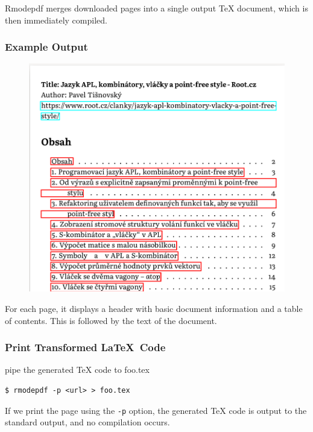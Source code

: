 Rmodepdf merges downloaded pages into a single output TeX document, which is then immediately compiled.


\begin{frame}[fragile]
  \frametitle{Example Output}
  \begin{figure}
    \begin{center}
      \includegraphics[height=0.7\textheight]{img/rmodepdf-article.png}
    \end{center}
  \end{figure}
  
\end{frame}

For each page, it displays a header with basic document information and a table
of contents. This is followed by the text of the document.



\begin{frame}[fragile]
  \frametitle{Print Transformed \LaTeX\ Code}
\begin{block}{pipe the generated TeX code to foo.tex}
\begin{verbatim}
$ rmodepdf -p <url> > foo.tex
\end{verbatim}
\end{block}
\end{frame}

If we print the page using the \verb|-p| option, the generated TeX code is output to the standard output, and no compilation occurs.



